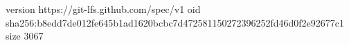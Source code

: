 version https://git-lfs.github.com/spec/v1
oid sha256:b8edd7de012fe645b1ad1620bcbc7d472581150272396252fd46d0f2e92677c1
size 3067
